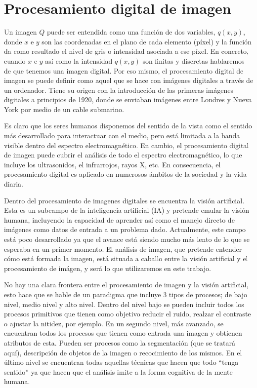 \documentclass[main]{subfiles}
\begin{document}
\section{Procesamiento digital de imagen}\label{sec:procesamiento}

Un imagen $Q$ puede ser entendida como una función de dos variables, ${q(x,y)}$, donde $x$ e $y$ son las coordenadas en el plano de cada elemento (píxel) y la función da como resultado el nivel de gris o intensidad asociada a ese píxel. En concreto, cuando $x$ e $y$ así como la intensidad ${q(x,y)}$ son finitas y discretas hablaremos de que tenemos una imagen digital. Por eso mismo, el procesamiento digital de imagen se puede definir como aquel que se hace con imágenes digitales a través de un ordenador. Tiene su origen con la introducción de las primeras imágenes digitales a principios de 1920, donde se enviaban imágenes entre Londres y Nueva York por medio de un cable submarino.

Es claro que los seres humanos disponemos del sentido de la vista como el sentido más desarrollado para interactuar con el medio, pero está limitada a la banda visible dentro del espectro electromagnético. En cambio, el procesamiento digital de imagen puede cubrir el análisis de todo el espectro electromagnético, lo que incluye los ultrasonidos, el infrarrojos, rayos X, etc. En consecuencia, el procesamiento digital es aplicado en numerosos ámbitos de la sociedad y la vida diaria.

Dentro del procesamiento de imagenes digitales se encuentra la visión artificial. Esta es un subcampo de la inteligencia artificial (IA) y pretende emular la visión humana, incluyendo la capacidad de aprender así como el manejo directo de imágenes como datos de entrada a un problema dado. Actualmente, este campo está poco desarrollado \cite{lib:gonzalez} ya que el avance está siendo mucho más lento de lo que se esperaba en un primer momento. El análisis de imagen, que pretende entender cómo está formada la imagen, está situada a caballo entre la visión artificial y el procesamiento de imágen, y será lo que utilizaremos en este trabajo.

No hay una clara frontera entre el procesamiento de imagen y la visión artificial, esto hace que se hable de un paradigma que incluye 3 tipos de procesos; de bajo nivel, medio nivel y alto nivel. Dentro del nivel bajo se pueden incluir todos los procesos primitivos que tienen como objetivo reducir el ruido, realzar el contraste o ajustar la nitidez, por ejemplo. En un segundo nivel, más avanzado, se encuentran todos los procesos que tienen como entrada una imagen y obtienen atributos de esta. Pueden ser procesos como la segmentación (que se tratará aquí), descripción de objetos de la imagen o recocimiento de los mismos. En el último nivel se encuentran todas aquellas técnicas que hacen que todo ``tenga sentido'' ya que hacen que el análisis imite a la forma cognitiva de la mente humana.
\end{document}
